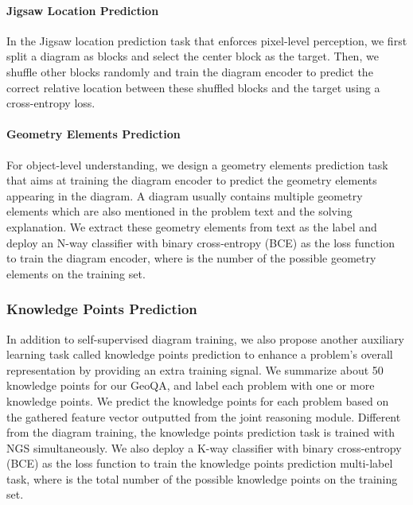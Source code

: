 \documentclass[11pt,a4paper]{article}
\begin{document}
\paragraph{Jigsaw Location Prediction}
In the Jigsaw location prediction task that enforces pixel-level perception, we first split a diagram as  blocks and select the center block as the target. Then, we shuffle other blocks randomly and train the diagram encoder to predict the correct relative location between these shuffled blocks and the target using a cross-entropy loss. 

\paragraph{Geometry Elements Prediction}
For object-level understanding, we design a geometry elements prediction task that aims at training the diagram encoder to predict the geometry elements appearing in the diagram. A diagram usually contains multiple geometry elements which are also mentioned in the problem text and the solving explanation. We extract these geometry elements from text as the label and deploy an N-way classifier with binary cross-entropy (BCE) as the loss function to train the diagram encoder, where  is the number of the possible geometry elements on the training set. 


\subsubsection{Knowledge Points Prediction}
In addition to self-supervised diagram training, we also propose another auxiliary learning task called knowledge points prediction to enhance a problem's overall representation by providing an extra training signal. We summarize about 50 knowledge points for our GeoQA, and label each problem with one or more knowledge points. We predict the knowledge points for each problem based on the gathered feature vector  outputted from the joint reasoning module. Different from the diagram training, the knowledge points prediction task is trained with NGS simultaneously. 
We also deploy a K-way classifier with binary cross-entropy (BCE) as the loss function to train the knowledge points prediction multi-label task, where  is the total number of the possible knowledge points on the training set.
\end{document}
